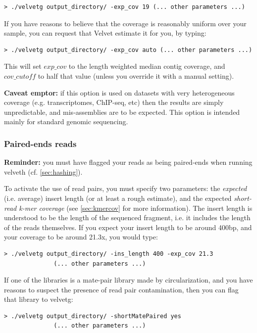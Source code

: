 \documentclass{article}
\begin{document}
\begin{verbatim}
> ./velvetg output_directory/ -exp_cov 19 (... other parameters ...)
\end{verbatim}

If you have reasons to believe that the coverage is reasonably uniform over your sample, you can request that Velvet estimate it for you, by typing:

\begin{verbatim}
> ./velvetg output_directory/ -exp_cov auto (... other parameters ...)
\end{verbatim}

This will set $exp\_cov$ to the length weighted median contig coverage, and $cov\_cutoff$ to half that value (unless you override it with a manual setting).

\textbf{Caveat emptor:} if this option is used on datasets with very heterogeneous coverage (e.g. transcriptomes, ChIP-seq, etc) then the results are simply unpredictable, and mis-assemblies are to be expected. This option is intended mainly for standard genomic sequencing.

	\subsubsection{Paired-ends reads}

\textbf{Reminder:} you must have flagged your reads as being paired-ends when running
velveth (cf. \ref{sec:hashing}).

To activate the use of read pairs, you must specify two parameters: the \emph{expected} (i.e. average) insert length (or at least a rough estimate), and the expected \emph{short-read k-mer coverage} (see \ref{sec:kmercov} for more information). The insert length is understood to be the length of the sequenced fragment, i.e. it includes the length of the reads themselves. If you expect your insert length to be around 400bp, and your coverage to be around 21.3x, you would type:

\begin{verbatim}
> ./velvetg output_directory/ -ins_length 400 -exp_cov 21.3 
	          (... other parameters ...)
\end{verbatim}

If one of the libraries is a mate-pair library made by circularization, and you have reasons to suspect the presence of read pair contamination, then you can flag that library to velvetg:

\begin{verbatim}
> ./velvetg output_directory/ -shortMatePaired yes 
	          (... other parameters ...)
\end{verbatim}
\end{document}
